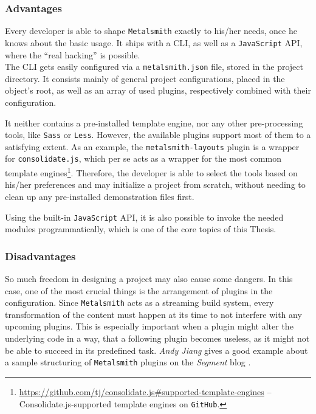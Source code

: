 \subsubsection{Advantages}
Every developer is able to shape \texttt{Metalsmith} exactly to his/her needs, once he knows about the basic usage. It ships with a CLI, as well as a \texttt{JavaScript} API, where the ``real hacking'' is possible.\\
The CLI gets easily configured via a \texttt{metalsmith.json} file, stored in the project directory. It consists mainly of general project configurations, placed in the object's root, as well as an array of used plugins, respectively combined with their configuration.

It neither contains a pre-installed template engine, nor any other pre-processing tools, like \texttt{Sass} or \texttt{Less}. However, the available plugins support most of them to a satisfying extent. As an example, the \texttt{metalsmith-layouts} plugin is a wrapper for \texttt{consolidate.js}, which per se acts as a wrapper for the most common template engines\footnote{\url{https://github.com/tj/consolidate.js\#supported-template-engines} -- Consolidate.js-supported template engines on \texttt{GitHub}.}. Therefore, the developer is able to select the tools based on his/her preferences and may initialize a project from scratch, without needing to clean up any pre-installed demonstration files first.

Using the built-in \texttt{JavaScript} API, it is also possible to invoke the needed modules programmatically, which is one of the core topics of this Thesis.

\subsubsection{Disadvantages}
So much freedom in designing a project may also cause some dangers. In this case, one of the most crucial things is the arrangement of plugins in the configuration. Since \texttt{Metalsmith} acts as a streaming build system, every transformation of the content must happen at its time to not interfere with any upcoming plugins. This is especially important when a plugin might alter the underlying code in a way, that a following plugin becomes useless, as it might not be able to succeed in its predefined task. \emph{Andy Jiang} gives a good example about a sample structuring of \texttt{Metalsmith} plugins on the \emph{Segment} blog \cite{Metalsmith2015technicaldocumentation}.

